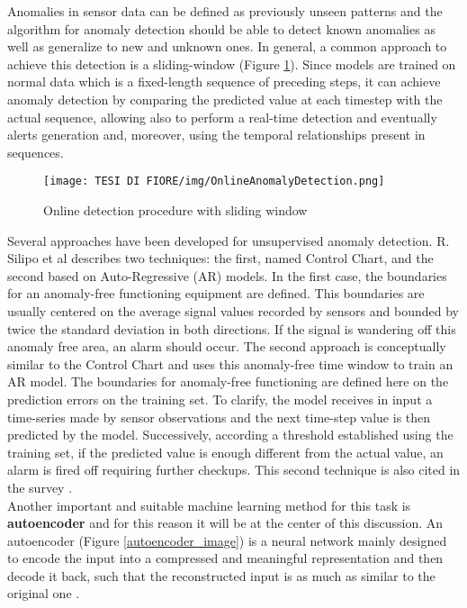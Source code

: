 Anomalies in sensor data can be defined as previously unseen patterns and the algorithm for anomaly detection should be able to detect known anomalies as well as generalize to new and unknown ones. In general, a common approach to achieve this detection is a sliding-window (Figure \ref{anomaly_detection_with_sliding_window}). Since models are trained on normal data which is a fixed-length sequence of preceding steps, it can achieve anomaly detection by comparing the predicted value at each timestep with the actual sequence, allowing also to perform a real-time detection and eventually alerts generation \cite{9UnsupervisedOnlineAnomalyDetectionMultivariate} and, moreover, using the temporal relationships present in sequences.
\begin{figure}[ht]
\texttt{[image: TESI DI FIORE/img/OnlineAnomalyDetection.png]}
\centering
\caption{Online detection procedure with sliding window \cite{9UnsupervisedOnlineAnomalyDetectionMultivariate}}
\label{anomaly_detection_with_sliding_window}
\end{figure}
Several approaches have been developed for unsupervised anomaly detection. R. Silipo et al \cite{8AnomalyDetectionUnsupervised2} describes two techniques: the first, named Control Chart, and the second based on Auto-Regressive (AR) models. In the first case, the boundaries for an anomaly-free functioning equipment are defined. This boundaries are usually centered on the average signal values recorded by sensors and bounded by twice the standard deviation in both directions. If the signal is wandering off this anomaly free area, an alarm should occur. The second approach is conceptually similar to the Control Chart and uses this anomaly-free time window to train an AR model. The boundaries for anomaly-free functioning are defined here on the prediction errors on the training set. To clarify, the model receives in input a time-series made by sensor observations and the next time-step value is then predicted by the model. Successively, according a threshold established using the training set, if the predicted value is enough different from the actual value, an alarm is fired off requiring further checkups. This second technique is also cited in the survey \cite{6AnomalyIoTTimeSeries}.\\
Another important and suitable machine learning method for this task is \textbf{autoencoder} and for this reason it will be at the center of this discussion. 
An autoencoder (Figure \ref{autoencoder_image}) is a neural network mainly designed to encode the input into a compressed and meaningful representation and then decode it back, such that the reconstructed input is as much as similar to the original one \cite{10Autoencoders}.\\
